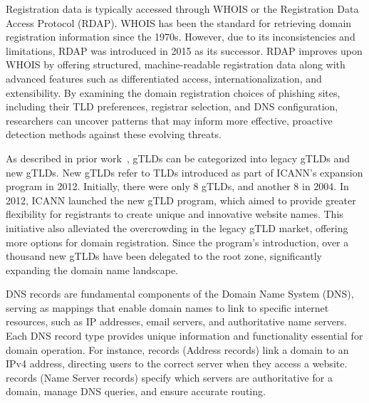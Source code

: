 Registration data is typically accessed through WHOIS or the Registration Data Access Protocol (RDAP). 
WHOIS has been the standard for retrieving domain registration information since the 1970s. 
However, due to its inconsistencies and limitations, RDAP was introduced in 2015 as its successor. RDAP improves upon WHOIS by offering structured, machine-readable registration data along with advanced features such as differentiated access, internationalization, and extensibility.
By examining the domain registration choices of phishing sites, including their TLD preferences, registrar selection, and DNS configuration, researchers can uncover patterns that may inform more effective, proactive detection methods against these evolving threats.

As described in prior work~\cite{AtLargeT9:online}, gTLDs can be categorized into legacy gTLDs and new gTLDs. New gTLDs refer to TLDs introduced as part of ICANN's expansion program in 2012.
Initially, there were only 8 gTLDs, and another 8 in 2004.
% 
In 2012, ICANN launched the new gTLD program, which aimed to provide greater flexibility for registrants to create unique and innovative website names. This initiative also alleviated the overcrowding in the legacy gTLD market, offering more options for domain registration. Since the program's introduction, over a thousand new gTLDs have been delegated to the root zone, significantly expanding the domain name landscape.

DNS records are fundamental components of the Domain Name System (DNS), serving as mappings that enable domain names to link to specific internet resources, such as IP addresses, email servers, and authoritative name servers. Each DNS record type provides unique information and functionality essential for domain operation. For instance,  records (Address records) link a domain to an IPv4 address, directing users to the correct server when they access a website.  records (Name Server records) specify which servers are authoritative for a domain, manage DNS queries, and ensure accurate routing. 

